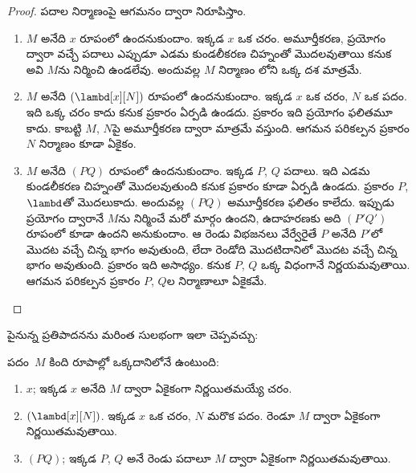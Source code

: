 \documentclass[../../../include/open-logic-section]{subfiles}
\begin{document}
\begin{proof}
  పదాల నిర్మాణంపై ఆగమనం ద్వారా నిరూపిస్తాం.
  \begin{enumerate}
    \item $M$ అనేది $x$ రూపంలో ఉందనుకుందాం. ఇక్కడ $x$ ఒక చరం.
      అమూర్తీకరణ, ప్రయోగం ద్వారా వచ్చే పదాలు ఎప్పుడూ ఎడమ కుండలీకరణ చిహ్నంతో
      మొదలవుతాయి కనుక అవి $M$ను నిర్మించి ఉండలేవు. అందువల్ల $M$
      నిర్మాణం లోని
      ఒక్క దశ మాత్రమే.
    \item $M$ అనేది $(\lambd[x][N])$ రూపంలో ఉందనుకుందాం. ఇక్కడ $x$
      ఒక చరం, $N$ ఒక పదం. ఇది ఒక్క చరం కాదు కనుక
       ప్రకారం
      ఏర్పడి ఉండదు.  ప్రకారం ఇది ప్రయోగం
      ఫలితమూ కాదు. కాబట్టి $M$, $N$పై అమూర్తీకరణ ద్వారా మాత్రమే
      వస్తుంది. ఆగమన పరికల్పన ప్రకారం $N$ నిర్మాణం కూడా ఏకైకం.
    \item $M$ అనేది $(PQ)$ రూపంలో ఉందనుకుందాం. ఇక్కడ $P$, $Q$
      పదాలు. ఇది ఎడమ కుండలీకరణ చిహ్నంతో మొదలవుతుంది కనుక
       ప్రకారం
      కూడా ఏర్పడి ఉండదు.  ప్రకారం $P$,
      $\lambd$తో మొదలుకాదు. అందువల్ల $(PQ)$ అమూర్తీకరణ ఫలితం
      కాలేదు. ఇప్పుడు ప్రయోగం ద్వారానే $M$ను నిర్మించే మరో మార్గం
      ఉందని, ఉదాహరణకు అది $(P'Q')$ రూపంలో కూడా ఉందని అనుకుందాం.
      ఆ రెండు విభజనలు వేర్వేరైతే $P$ అనేది $P'$లో మొదట వచ్చే చిన్న భాగం
      అవుతుంది, లేదా రెండోది మొదటిదానిలో మొదట వచ్చే చిన్న భాగం అవుతుంది.
       ప్రకారం ఇది అసాధ్యం. కనుక $P$, $Q$ ఒక్క
      విధంగానే నిర్ణయమవుతాయి. ఆగమన పరికల్పన ప్రకారం $P$, $Q$ల నిర్మాణాలూ ఏకైకమే.
  \end{enumerate}
\end{proof}

పైనున్న ప్రతిపాదనను మరింత సులభంగా ఇలా చెప్పవచ్చు:
\begin{prop}
  పదం~$M$ కింది రూపాల్లో ఒక్కదానిలోనే ఉంటుంది:
  \begin{enumerate}
    \item $x$; ఇక్కడ $x$ అనేది $M$ ద్వారా ఏకైకంగా నిర్ణయితమయ్యే చరం.
    \item $(\lambd[x][N])$. ఇక్కడ $x$ ఒక చరం, $N$ మరొక పదం.
      రెండూ $M$ ద్వారా ఏకైకంగా నిర్ణయితమవుతాయి.
    \item $(PQ)$; ఇక్కడ $P$, $Q$ అనే రెండు పదాలూ $M$ ద్వారా
      ఏకైకంగా నిర్ణయితమవుతాయి.
  \end{enumerate}
\end{prop}
\end{document}
